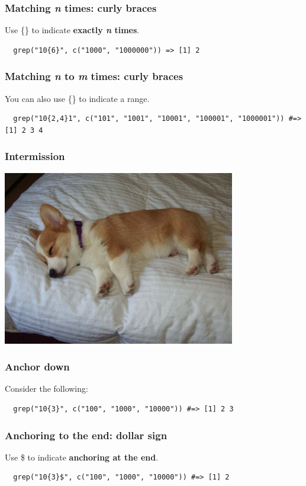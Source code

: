 \documentclass{beamer}
\begin{document}
\begin{frame}[fragile]
  \frametitle{Matching \emph{n} times: curly braces}
  Use \{\} to indicate \textbf{exactly \emph{n} times}.
  \vspace{3mm}

\begin{verbatim}
  grep("10{6}", c("1000", "1000000")) => [1] 2
\end{verbatim}
\end{frame}
\begin{frame}[fragile]
  \frametitle{Matching \emph{n} to \emph{m} times: curly braces}
  You can also use \{\} to indicate a range.
  \vspace{3mm}

\begin{verbatim}
  grep("10{2,4}1", c("101", "1001", "10001", "100001", "1000001")) #=> [1] 2 3 4
\end{verbatim}
\end{frame}
\begin{frame}
  \frametitle{Intermission}
  \includegraphics[width=4in]{"sleeping-corgi"}
\end{frame}
\begin{frame}[fragile]
  \frametitle{Anchor down}
  Consider the following:
  \vspace{3mm}

\begin{verbatim}
  grep("10{3}", c("100", "1000", "10000")) #=> [1] 2 3
\end{verbatim}
\end{frame}
\begin{frame}[fragile]
  \frametitle{Anchoring to the end: dollar sign}
  Use \$ to indicate \textbf{anchoring at the end}.
  \vspace{3mm}

\begin{verbatim}
  grep("10{3}$", c("100", "1000", "10000")) #=> [1] 2
\end{verbatim}
\end{frame}
\end{document}
